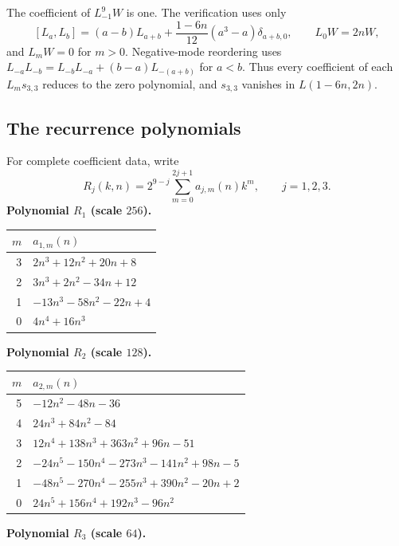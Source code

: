 \documentclass[11pt]{article}
\numberwithin{equation}{section}
\begin{document}
The coefficient of $L_{-1}^9W$ is one. The verification uses only
\[
[L_a,L_b]=(a-b)L_{a+b}+\frac{1-6n}{12}(a^3-a)\delta_{a+b,0},\qquad L_0W=2nW,
\]
and $L_mW=0$ for $m>0$. Negative-mode reordering uses
$L_{-a}L_{-b}=L_{-b}L_{-a}+(b-a)L_{-(a+b)}$ for $a<b$.
Thus every coefficient of each $L_ms_{3,3}$ reduces to the zero polynomial, and $s_{3,3}$ vanishes in $L(1-6n,2n)$.

\subsection{The recurrence polynomials}
For complete coefficient data, write
\[
R_j(k,n)=2^{9-j}\sum_{m=0}^{2j+1}a_{j,m}(n)k^m,\qquad j=1,2,3.
\]
\noindent\textbf{Polynomial $R_1$ (scale $256$).}
\begin{center}\small\begin{tabular}{@{}r l@{}}\toprule
$m$ & $a_{1,m}(n)$\\\midrule
3 & $2 n^{3} + 12 n^{2} + 20 n + 8$ \\
2 & $3 n^{3} + 2 n^{2} - 34 n + 12$ \\
1 & $- 13 n^{3} - 58 n^{2} - 22 n + 4$ \\
0 & $4 n^{4} + 16 n^{3}$ \\
\bottomrule\end{tabular}\end{center}
\noindent\textbf{Polynomial $R_2$ (scale $128$).}
\begin{center}\small\begin{tabular}{@{}r l@{}}\toprule
$m$ & $a_{2,m}(n)$\\\midrule
5 & $- 12 n^{2} - 48 n - 36$ \\
4 & $24 n^{3} + 84 n^{2} - 84$ \\
3 & $12 n^{4} + 138 n^{3} + 363 n^{2} + 96 n - 51$ \\
2 & $- 24 n^{5} - 150 n^{4} - 273 n^{3} - 141 n^{2} + 98 n - 5$ \\
1 & $- 48 n^{5} - 270 n^{4} - 255 n^{3} + 390 n^{2} - 20 n + 2$ \\
0 & $24 n^{5} + 156 n^{4} + 192 n^{3} - 96 n^{2}$ \\
\bottomrule\end{tabular}\end{center}
\noindent\textbf{Polynomial $R_3$ (scale $64$).}
\end{document}
